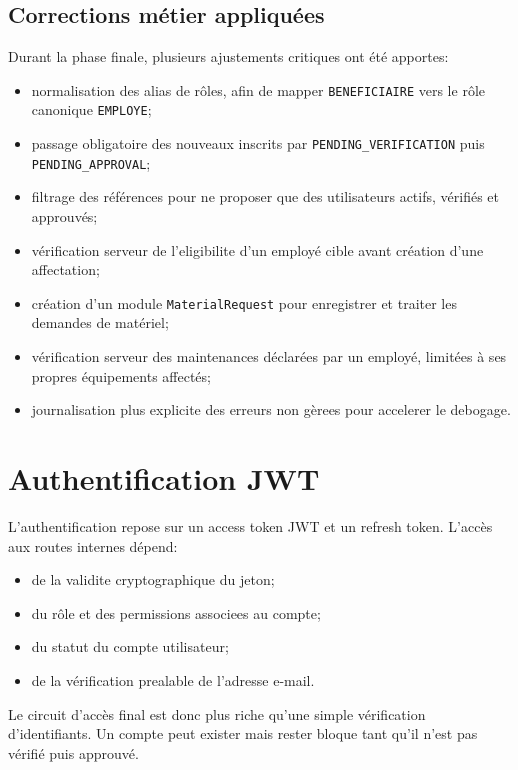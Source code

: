 ﻿\documentclass[12pt,a4paper,oneside]{report}
\begin{document}
\subsection{Corrections métier appliquées}
Durant la phase finale, plusieurs ajustements critiques ont été apportes:
\begin{itemize}
  \item normalisation des alias de rôles, afin de mapper \texttt{BENEFICIAIRE} vers le rôle canonique \texttt{EMPLOYE};
  \item passage obligatoire des nouveaux inscrits par \texttt{PENDING\_VERIFICATION} puis \texttt{PENDING\_APPROVAL};
  \item filtrage des références pour ne proposer que des utilisateurs actifs, vérifiés et approuvés;
  \item vérification serveur de l'eligibilite d'un employé cible avant création d'une affectation;
  \item création d'un module \texttt{MaterialRequest} pour enregistrer et traiter les demandes de matériel;
  \item vérification serveur des maintenances déclarées par un employé, limitées à ses propres équipements affectés;
  \item journalisation plus explicite des erreurs non gèrees pour accelerer le debogage.
\end{itemize}

\section{Authentification JWT}
L'authentification repose sur un access token JWT et un refresh token. L'accès aux routes internes dépend:
\begin{itemize}
  \item de la validite cryptographique du jeton;
  \item du rôle et des permissions associees au compte;
  \item du statut du compte utilisateur;
  \item de la vérification prealable de l'adresse e-mail.
\end{itemize}

Le circuit d'accès final est donc plus riche qu'une simple vérification d'identifiants. Un compte peut exister mais rester bloque tant qu'il n'est pas vérifié puis approuvé.
\end{document}
